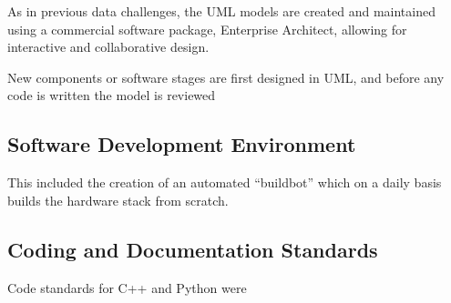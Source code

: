 As in previous data challenges, the UML models are created
and maintained using a commercial software package, 
Enterprise Architect, allowing for interactive and collaborative
design.

New components or software stages are first designed in UML,
and before any code is written the model is reviewed 

\subsection{Software Development Environment}





This included the creation of an automated ``buildbot'' which
on a daily basis builds the hardware stack from scratch.

\subsection{Coding and Documentation Standards}

Code standards for C++ and Python were 


